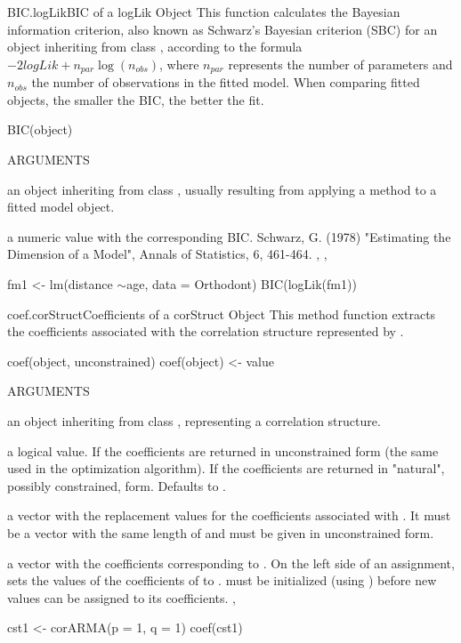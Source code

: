 \documentclass[pdftex]{article} \usepackage{url,graphicx}
\renewcommand{\Twiddle}{\mbox{\(\sim\)}}
\begin{document}
\begin{Helpfile}{BIC.logLik}{BIC of a logLik Object}
  This function calculates the Bayesian information criterion, also
  known as Schwarz's Bayesian criterion (SBC) for an object inheriting
  from class , according to the formula $-2logLik +
  n_{par}\log(n_{obs})$, where $n_{par}$ represents the number of
  parameters and $n_{obs}$ the number of observations in the fitted
  model. When comparing fitted objects, the smaller the BIC, the
  better the fit.
\begin{Example}
BIC(object)
\end{Example}
\begin{Argument}{ARGUMENTS}
\item[\Co{object:}]
an object inheriting from class , usually
resulting from applying a  method to a fitted model
object.
\end{Argument}
a numeric value with the corresponding BIC.
Schwarz, G. (1978) "Estimating the Dimension of a Model", Annals of
Statistics, 6, 461-464.
, , 
\need 15pt
\vspace{-16pt} 
\begin{Example}
fm1 <- lm(distance \Twiddle age, data = Orthodont) 
BIC(logLik(fm1))
\end{Example}
\end{Helpfile}
\begin{Helpfile}{coef.corStruct}{Coefficients of a corStruct Object}
This method function extracts the coefficients associated with the
correlation structure represented by .
\begin{Example}
coef(object, unconstrained)
coef(object) <- value
\end{Example}
\begin{Argument}{ARGUMENTS}
\item[\Co{object:}]
an object inheriting from class ,
representing a correlation structure.
\item[\Co{unconstrained:}]
a logical value. If  the coefficients
are returned in unconstrained form (the same used in the optimization
algorithm). If  the coefficients are returned in
"natural", possibly constrained, form. Defaults to .
\item[\Co{value:}]
a vector with the replacement values for the coefficients
associated with . It must be a vector with the same length
of  and must be given in unconstrained form.
\end{Argument}
a vector with the coefficients corresponding to .
On the left side of an assignment, sets the values of the coefficients
of  to .  must be initialized (using
) before new values can be assigned to its
coefficients.
, 
\need 15pt
\vspace{-16pt} 
\begin{Example}
cst1 <- corARMA(p = 1, q = 1)
coef(cst1)
\end{Example}
\end{Helpfile}
\end{document}
